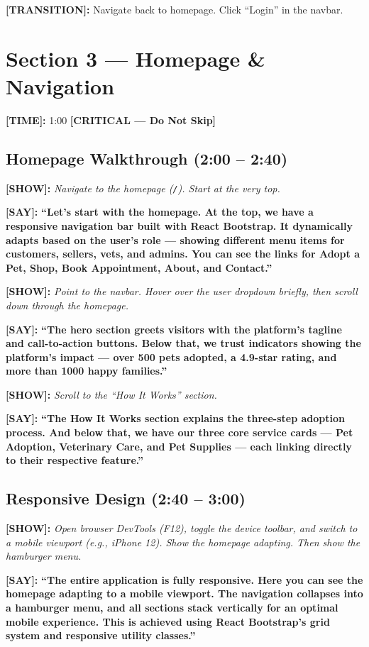 \documentclass[12pt,a4paper]{article}
\newcommand{\say}[1]{\textbf{\textcolor{narration}{[SAY]:}} \textbf{``#1''}}
\newcommand{\show}[1]{\textbf{\textcolor{screen}{[SHOW]:}} \textit{#1}}
\newcommand{\timing}[1]{\textbf{\textcolor{timing}{[TIME]:}} #1}
\newcommand{\trans}[1]{\textbf{\textcolor{transition}{[TRANSITION]:}} #1}
\newcommand{\critical}{\textcolor{critical}{\textbf{[CRITICAL --- Do Not Skip]}}}
\begin{document}
\trans{Navigate back to homepage. Click ``Login'' in the navbar.}

\newpage

\section{Section 3 --- Homepage \& Navigation}
\label{sec:homepage}

\timing{1:00} \hfill \critical

\subsection{Homepage Walkthrough (2:00 -- 2:40)}

\show{Navigate to the homepage (\texttt{/}). Start at the very top.}

\say{Let's start with the homepage. At the top, we have a responsive navigation bar built with React Bootstrap. It dynamically adapts based on the user's role --- showing different menu items for customers, sellers, vets, and admins. You can see the links for Adopt a Pet, Shop, Book Appointment, About, and Contact.}

\show{Point to the navbar. Hover over the user dropdown briefly, then scroll down through the homepage.}

\say{The hero section greets visitors with the platform's tagline and call-to-action buttons. Below that, we trust indicators showing the platform's impact --- over 500 pets adopted, a 4.9-star rating, and more than 1000 happy families.}

\show{Scroll to the ``How It Works'' section.}

\say{The How It Works section explains the three-step adoption process. And below that, we have our three core service cards --- Pet Adoption, Veterinary Care, and Pet Supplies --- each linking directly to their respective feature.}

\subsection{Responsive Design (2:40 -- 3:00)}

\show{Open browser DevTools (F12), toggle the device toolbar, and switch to a mobile viewport (e.g., iPhone 12). Show the homepage adapting. Then show the hamburger menu.}

\say{The entire application is fully responsive. Here you can see the homepage adapting to a mobile viewport. The navigation collapses into a hamburger menu, and all sections stack vertically for an optimal mobile experience. This is achieved using React Bootstrap's grid system and responsive utility classes.}
\end{document}
